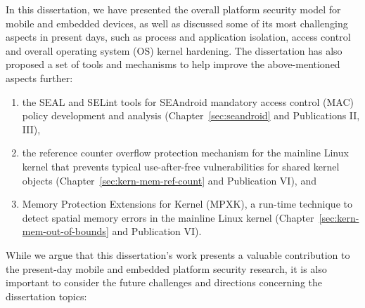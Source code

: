
In this dissertation, we have presented the overall platform security model for mobile and embedded devices, as well as discussed some of its most challenging aspects in present days, such as process and application isolation, access control and overall operating system (OS) kernel hardening.
The dissertation has also proposed a set of tools and mechanisms to help improve the above-mentioned aspects further: 
\begin{enumerate}
	\item the SEAL and SELint tools for SEAndroid mandatory access control (MAC) policy development and analysis (Chapter~\ref{sec:seandroid} and Publications II, III),
	\item the reference counter overflow protection mechanism for the mainline Linux kernel that prevents typical use-after-free vulnerabilities for shared kernel objects (Chapter~\ref{sec:kern-mem-ref-count} and Publication VI), and
	\item Memory Protection Extensions for Kernel (MPXK), a run-time technique to detect spatial memory errors in the mainline Linux kernel (Chapter~\ref{sec:kern-mem-out-of-bounds} and Publication VI). 
\end{enumerate}

While we argue that this dissertation's work presents a valuable contribution to the present-day mobile and embedded platform security research, it is also important to consider the future challenges and directions concerning the dissertation topics:

